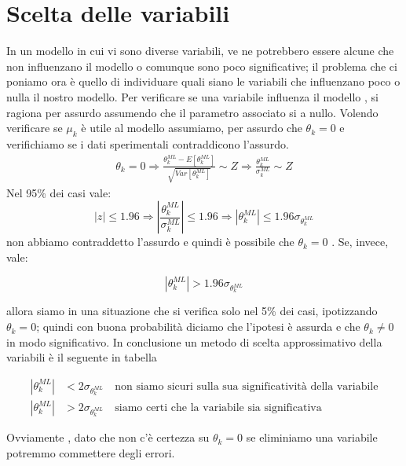 \section{Scelta delle variabili}
In un modello in cui vi sono diverse variabili, ve ne potrebbero essere alcune che non influenzano il modello o comunque sono poco significative; il problema che ci poniamo ora è quello di individuare quali siano le variabili che influenzano poco o nulla il nostro modello.\newline
Per verificare se una variabile influenza il modello , si ragiona per assurdo assumendo che il parametro associato si a nullo.\newline
Volendo verificare se $\mu_k$ è utile al modello assumiamo, per assurdo che $\theta_k=0$ e verifichiamo se i dati sperimentali contraddicono l'assurdo.
  \begin{align*}
    \theta_k=0 \Rightarrow \frac{\theta_k^{ML}-E[\theta_k^{ML}]}{\sqrt{Var[\theta_k^{ML}]}}\sim Z\Rightarrow \frac{\theta_k^{ML}}{\sigma_k^{ML}}\sim Z
  \end{align*}
Nel 95\% dei casi vale:
  \[    \left| z \right| \leq 1.96 \Rightarrow \left| \frac{\theta_k^{ML}}{\sigma_k^{ML}} \right|\leq 1.96 \Rightarrow \left| \theta_k^{ML} \right| \leq 1.96\sigma_{\theta_k^{ML} }  \]
non abbiamo contraddetto l'assurdo e quindi è possibile che $\theta_k=0$ . Se, invece, vale:
  
    \[ |\theta_k^{ML} |>1.96\sigma_{\theta_k^{ML}} \]

allora siamo in una situazione che si verifica solo nel 5\% dei casi, ipotizzando $\theta_k=0$; quindi con buona probabilità diciamo che l'ipotesi è assurda e che $\theta_k\ne 0$ in modo significativo.\newline
In conclusione un metodo di scelta approssimativo della variabili è il seguente in tabella

  \begin{align*}
    | \theta_k^{ML} |&<2\sigma_{\theta_k^{ML}} \quad \text{non siamo sicuri sulla sua significatività della variabile}\\
    | \theta_k^{ML} |&>2\sigma_{\theta_k^{ML}} \quad \text{siamo certi che la variabile sia significativa}
  \end{align*}

Ovviamente , dato che non c'è certezza su $\theta_k=0$ se eliminiamo una variabile potremmo commettere degli errori.
